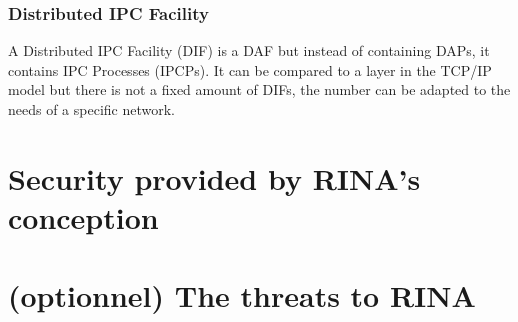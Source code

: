 \documentclass[a4paper]{proc}
\begin{document}
\section{Distributed IPC Facility}
A Distributed IPC Facility (DIF) is a DAF but instead of containing DAPs, it contains IPC Processes (IPCPs).
It can be compared to a layer in the TCP/IP model but there is not a fixed amount of DIFs, the number can be adapted to the needs of a specific network.

\part{Security provided by RINA's conception}

\part{(optionnel) The threats to RINA}

\nocite{*}
\newpage


\end{document}
